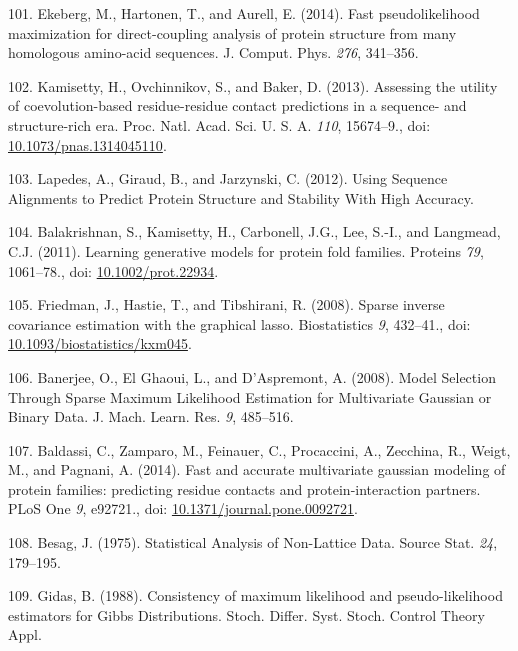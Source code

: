 \documentclass[11pt,a4paper,twoside]{book}
\theoremstyle{definition}
\theoremstyle{definition}
\theoremstyle{remark}
\begin{document}
\hypertarget{ref-Ekeberg2014}{}
101. Ekeberg, M., Hartonen, T., and Aurell, E. (2014). Fast
pseudolikelihood maximization for direct-coupling analysis of protein
structure from many homologous amino-acid sequences. J. Comput. Phys.
\emph{276}, 341--356.

\hypertarget{ref-Kamisetty2013}{}
102. Kamisetty, H., Ovchinnikov, S., and Baker, D. (2013). Assessing the
utility of coevolution-based residue-residue contact predictions in a
sequence- and structure-rich era. Proc. Natl. Acad. Sci. U. S. A.
\emph{110}, 15674--9., doi:
\href{https://doi.org/10.1073/pnas.1314045110}{10.1073/pnas.1314045110}.

\hypertarget{ref-Lapedes2012a}{}
103. Lapedes, A., Giraud, B., and Jarzynski, C. (2012). Using Sequence
Alignments to Predict Protein Structure and Stability With High
Accuracy.

\hypertarget{ref-Balakrishnan2011}{}
104. Balakrishnan, S., Kamisetty, H., Carbonell, J.G., Lee, S.-I., and
Langmead, C.J. (2011). Learning generative models for protein fold
families. Proteins \emph{79}, 1061--78., doi:
\href{https://doi.org/10.1002/prot.22934}{10.1002/prot.22934}.

\hypertarget{ref-Friedman2008}{}
105. Friedman, J., Hastie, T., and Tibshirani, R. (2008). Sparse inverse
covariance estimation with the graphical lasso. Biostatistics \emph{9},
432--41., doi:
\href{https://doi.org/10.1093/biostatistics/kxm045}{10.1093/biostatistics/kxm045}.

\hypertarget{ref-Banerjee2008}{}
106. Banerjee, O., El Ghaoui, L., and D'Aspremont, A. (2008). Model
Selection Through Sparse Maximum Likelihood Estimation for Multivariate
Gaussian or Binary Data. J. Mach. Learn. Res. \emph{9}, 485--516.

\hypertarget{ref-Baldassi2014}{}
107. Baldassi, C., Zamparo, M., Feinauer, C., Procaccini, A., Zecchina,
R., Weigt, M., and Pagnani, A. (2014). Fast and accurate multivariate
gaussian modeling of protein families: predicting residue contacts and
protein-interaction partners. PLoS One \emph{9}, e92721., doi:
\href{https://doi.org/10.1371/journal.pone.0092721}{10.1371/journal.pone.0092721}.

\hypertarget{ref-Besag1975}{}
108. Besag, J. (1975). Statistical Analysis of Non-Lattice Data. Source
Stat. \emph{24}, 179--195.

\hypertarget{ref-Gidas1988}{}
109. Gidas, B. (1988). Consistency of maximum likelihood and
pseudo-likelihood estimators for Gibbs Distributions. Stoch. Differ.
Syst. Stoch. Control Theory Appl.
\end{document}
